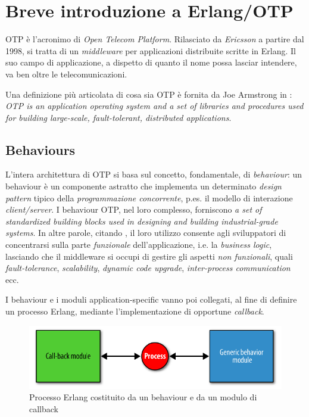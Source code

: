 %
\section{Breve introduzione a Erlang/OTP}
%
OTP \`e l'acronimo di \emph{Open Telecom Platform}. Rilasciato da \emph{Ericsson} 
a partire dal 1998, si tratta di un \emph{middleware} per applicazioni distribuite 
scritte in Erlang\cite{erlang}. Il suo campo di applicazione, a dispetto di quanto 
il nome possa lasciar intendere, va ben oltre le telecomunicazioni.
%

%
Una definizione pi\`u articolata di cosa sia OTP \`e fornita da Joe Armstrong in 
\cite{armstrong07}: \emph{OTP is an application operating system and a set of libraries 
and procedures used for building large-scale, fault-tolerant, distributed applications}.
%

%
\subsection{Behaviours}
%
L'intera architettura di OTP si basa sul concetto, fondamentale, di \emph{behaviour}:
un behaviour \`e un componente astratto che implementa un determinato 
\emph{design pattern} tipico della \emph{programmazione concorrente}, p.es. il modello di 
interazione \emph{client/server}. 
%
I behaviour OTP, nel loro complesso, forniscono \emph{a set of standardized building 
blocks used in designing and building industrial-grade systems}\cite{cesarini09}.
%
In altre parole, citando \cite{armstrong07}, il loro utilizzo consente agli sviluppatori 
di concentrarsi sulla parte \emph{funzionale} dell'applicazione, i.e. la \emph{business logic}, 
lasciando che il middleware si occupi di gestire gli aspetti \emph{non funzionali}, quali 
\emph{fault-tolerance}, \emph{scalability}, \emph{dynamic code upgrade}, \emph{inter-process 
communication} ecc.
%

%
I behaviour e i moduli application-specific vanno poi collegati, al fine di definire 
un processo Erlang, mediante l'implementazione di opportune \emph{callback}.
%
\begin{figure}[!h]
\centering
\includegraphics[width=400pt]{img/erl-behaviour.png}
\caption{Processo Erlang costituito da un behaviour e da un modulo di callback}
\end{figure}
%

